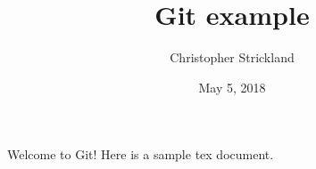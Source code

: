 \documentclass[11pt,letterpaper]{article}
\title{Git example}
\author{Christopher Strickland}
\date{May 5, 2018}
\begin{document}
	
	\maketitle
	
	Welcome to Git! Here is a sample tex document.
	
\end{document}
